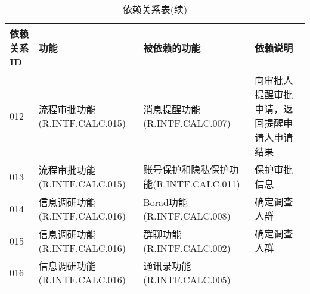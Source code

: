 \begin{table}[htbp]
    \centering
    \caption{\color{red}依赖关系表(续)} \label{tab:classification}
    \begin{tabular}{|p{6em}|p{9em}|p{9em}|p{7em}|}
            \hline%
            依赖关系ID  & 功能                                     & 被依赖的功能                              & 依赖说明 \\
            \hline%
                \color{red}012        
            &   \color{red}流程审批功能(R.INTF.CALC.015)            
            &   \color{red}消息提醒功能(R.INTF.CALC.007)                
            &   \color{red}向审批人提醒审批申请，返回提醒申请人申请结果\\
            \hline%
                \color{red}013        
            &   \color{red}流程审批功能(R.INTF.CALC.015)            
            &   \color{red}账号保护和隐私保护功能(R.INTF.CALC.011)                
            &   \color{red}保护审批信息\\
            \hline%
                \color{red}014        
            &   \color{red}信息调研功能(R.INTF.CALC.016)            
            &   \color{red}Borad功能(R.INTF.CALC.008)                           
            &   \color{red}确定调查人群\\
            \hline%
                \color{red}015        
            &   \color{red}信息调研功能(R.INTF.CALC.016)            
            &   \color{red}群聊功能(R.INTF.CALC.002)                           
            &   \color{red}确定调查人群\\
            \hline%
                \color{red}016        
            &   \color{red}信息调研功能(R.INTF.CALC.016)            
            &   \color{red}通讯录功能(R.INTF.CALC.005)                            

\end{tabular}
\end{table}
